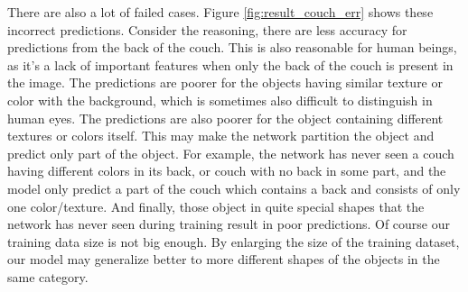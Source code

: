 There are also a lot of failed cases. Figure \ref{fig:result_couch_err} shows these incorrect predictions. Consider the reasoning, there are less accuracy for predictions from the back of the couch. This is also reasonable for human beings, as it's a lack of important features when only the back of the couch is present in the image. The predictions are poorer for the objects having similar texture or color with the background, which is sometimes also difficult to distinguish in human eyes. The predictions are also poorer for the object containing different textures or colors itself. This may make the network partition the object and predict only part of the object. For example, the network has never seen a couch having different colors in its back, or couch with no back in some part, and the model only predict a part of the couch which contains  a back and consists of only one color/texture. And finally, those object in quite special shapes that the network has never seen during training result in poor predictions. Of course our training data size is not big enough. By enlarging the size of the training dataset, our model  may generalize better to more different shapes of the objects in the same category.

